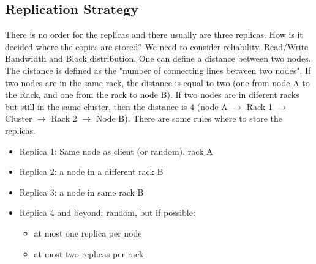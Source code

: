 \subsection{Replication Strategy}
There is no order for the replicas and there usually are three replicas. How is it decided where the copies are stored? We need to consider reliability, Read/Write Bandwidth and Block distribution. One can define a distance between two nodes. The distance is defined as the "number of connecting lines between two nodes". If two nodes are in the same rack, the distance is equal to two (one from node A to the Rack, and one from the rack to node B). If two nodes are in diferent racks but still in the same cluster, then the distance is 4 (node A $\rightarrow$ Rack 1 $\rightarrow$ Cluster $\rightarrow$ Rack 2 $\rightarrow$ Node B). There are some rules where to store the replicas.
\begin{itemize}
    \item Replica 1: Same node as client (or random), rack A
    \item Replica 2: a node in a different rack B
    \item Replica 3: a node in same rack B
    \item Replica 4 and beyond: random, but if possible:
        \begin{itemize}
            \item at most one replica per node
            \item at most two replicas per rack
        \end{itemize}
\end{itemize}

